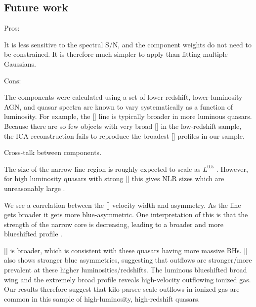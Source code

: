 \subsection{Future work}

Pros:

It is less sensitive to the spectral S/N, and the component weights do not need to be constrained. 
It is therefore much simpler to apply than fitting multiple Gaussians. 

Cons:

The components were calculated using a set of lower-redshift, lower-luminosity AGN, and quasar spectra are known to vary systematically as a function of luminosity. 
For example, the [] line is typically broader in more luminous quasars. 
Because there are so few objects with very broad [] in the low-redshift sample, the ICA reconstruction fails to reproduce the broadest [] profiles in our sample. 

Cross-talk between components. 






The size of the narrow line region is roughly expected to scale as $L^{0.5}$ \citep[e.g.][]{netzer04}. 
However, for high luminosity quasars with strong [] this gives NLR sizes which are unreasonably large \citep[$\sim100$ kilo-parsec;][]{netzer04}. 




We see a correlation between the [] velocity width and asymmetry. 
As the line gets broader it gets more blue-asymmetric. 
One interpretation of this is that the strength of the narrow core is decreasing, leading to a broader and more blueshifted profile \citep[e.g.][]{shen14}. 


[] is broader, which is consistent with these quasars having more massive BHs. 
[] also shows stronger blue asymmetries, suggesting that outflows are stronger/more prevalent at these higher luminosities/redshifts. 
The luminous blueshifted broad wing and the extremely broad profile reveals high-velocity outflowing ionized gas. 
Our results therefore suggest that kilo-parsec-scale outflows in ionized gas are common in this sample of high-luminosity, high-redshift quasars.



